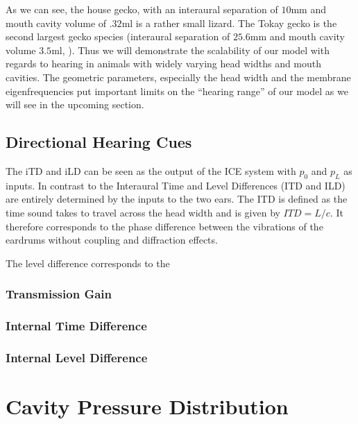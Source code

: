 As we can see, the house gecko, with an interaural separation of $10$mm and mouth cavity volume of $.32$ml is a rather
small lizard. The Tokay gecko is the second largest gecko species (interaural separation of $25.6$mm and mouth cavity volume $3.5$ml, \cite{dalsgaardtangcarr}).
Thus we will demonstrate the scalability of our model with regards to hearing in animals with widely varying head widths and mouth cavities. The geometric parameters, especially
the head width and the membrane eigenfrequencies put important limits on the ``hearing range'' of our model as we will see in the upcoming section.

\subsection{Directional Hearing Cues}\label{hearingcuessection}
The iTD and iLD can be seen as the output of the ICE system with $p_0$ and $p_L$ as inputs.
In contrast to the Interaural Time and Level Differences (ITD and ILD) are entirely determined 
by the inputs to the two ears. The ITD is defined as the time sound takes to travel across
the head width and is given by $ITD=L/c$. It therefore corresponds to the phase difference
between the vibrations of the eardrums without coupling and diffraction effects. 

The level difference corresponds to the 

\subsubsection{Transmission Gain}

\subsubsection{Internal Time Difference}

\subsubsection{Internal Level Difference}

\section{Cavity Pressure Distribution}\label{pressuredistchapter}

